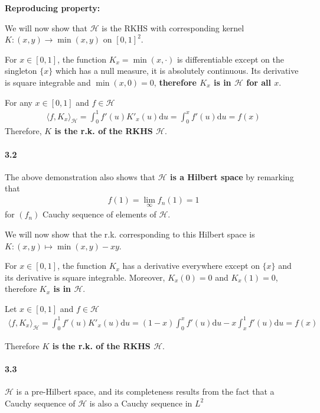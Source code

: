 \documentclass[10pt]{article}
\begin{document}
    \textbf{Reproducing property: }

    We will now show that $\mathcal{H}$ is the RKHS with corresponding kernel 
    $K: (x, y) \rightarrow \min(x, y)$ on $[0, 1]^2$.

    For $x\in [0, 1]$, the function $K_x = \min(x,\cdot)$ is differentiable 
    except on the singleton $\{x\}$ which has a null measure, it is absolutely 
    continuous. Its derivative is square integrable and $\min(x,0) = 0$, 
    \textbf{therefore $K_x$ is in $\mathcal{H}$ for all $x$}.

    For any $x\in [0, 1]$ and $f \in \mathcal{H}$
    \begin{align*}
        \langle f, K_x \rangle_\mathcal{H} = \int_0^1 f'(u)K'_x(u)\text{d}u = 
        \int_0^x f'(u)\text{d}u = f(x)
    \end{align*}
    Therefore, \textbf{$K$ is the r.k. of the RKHS $\mathcal{H}$}.

    \paragraph{3.2} The above demonstration also shows that 
    \textbf{$\mathcal{H}$ is a Hilbert space} by remarking that 
    \begin{align*}
        f(1) = \lim_\infty f_n(1) = 1
    \end{align*} for $(f_n)$ Cauchy sequence of elements of 
    $\mathcal{H}$.
    
    We will now show that the r.k. corresponding to this Hilbert space is $K: 
    (x, y) \mapsto \min(x,y) - xy$. 

    For $x\in[0, 1]$, the function $K_x$ has a derivative everywhere except on 
    $\{x\}$ and its derivative is square integrable. Moreover, $K_x(0) = 0$ and 
    $K_x(1) = 0 $, therefore \textbf{$K_x$ is in $\mathcal{H}$}.

    Let $x\in[0, 1]$ and $f\in \mathcal{H}$
    \begin{align*}
        \langle f, K_x \rangle_\mathcal{H} = \int_0^1 f'(u)K'_x(u)\text{d}u = 
        (1-x)\int_0^x f'(u)\text{d}u - x \int_x^1 f'(u)\text{d}u = f(x)
    \end{align*}

    Therefore \textbf{$K$ is the r.k. of the RKHS $\mathcal{H}$}.

    \paragraph{3.3} $\mathcal{H}$ is a pre-Hilbert space, and its completeness
    results from the fact that a Cauchy sequence of $\mathcal{H}$ is also a 
    Cauchy sequence in $L^2$
    
\end{document}
